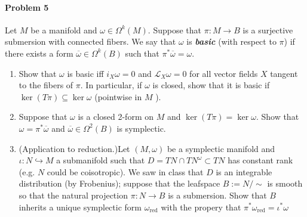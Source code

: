 \paragraph{Problem 5} Let $M$ be a manifold and $\omega\in\Omega^{k}(M)$. Suppose that $\pi:M\to B$ is a surjective submersion with connected fibers. 
We say that $\omega$ is \textit{\textbf{basic}} (with respect to $\pi$) if there exists a form $\overline{\omega} \in \Omega^{k}(B)$ such that $\pi^*\overline{\omega} =\omega$.
\begin{enumerate}[label=\alph*.]
	\item Show that $\omega$ is basic iff $i_X\omega=0$ and $\mathcal{L}_{X}\omega=0$ for all vector fields $X$ tangent to the fibers of $\pi$. In particular, if $\omega$ is closed, show that it is basic if $\ker(T\pi)\subseteq\ker \omega$ (pointwise in $M$ ).

		\item Suppose that $\omega$ is a closed 2-form on $M$ and $\ker(T\pi)=\ker \omega$. Show that $\omega=\pi^*\overline{\omega}$ and $\overline{\omega}\in\Omega^{2}(B)$ is symplectic.

		\item {\color{6}(Application to reduction.)}\hspace{0.5em}Let $(M,\omega)$ be a symplectic manifold and $\iota:N\hookrightarrow M$ a submanifold such that $D=TN\cap T N^\omega\subset T N$ has constant rank (e.g. $N$ could be coisotropic). We saw in class that $D$ is an integrable distribution (by Frobenius); suppose that the leafspace $B:=N/\sim$ is smooth so that the natural projection $\pi:N\longrightarrow B$ is a submersion. Show that $B$ inherits a unique symplectic form $\omega_{\operatorname{red}}$ with the propery that $\pi^*\omega_{\operatorname{red}}=\iota ^*\omega$
\end{enumerate}

